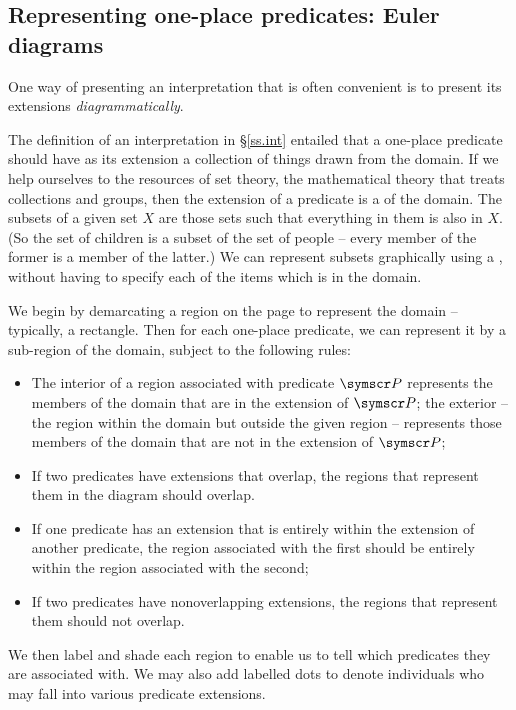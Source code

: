\begin{earg}
\section{Representing one-place predicates: Euler diagrams}\label{euler}

One way of presenting an interpretation that is often convenient is to present its extensions \emph{diagrammatically}.

The definition of an interpretation in §\ref{ss.int} entailed that a one-place predicate should have as its extension a collection of things drawn from the domain. If we help ourselves to the resources of set theory, the mathematical theory that treats collections and groups, then the extension of a predicate is a  of the domain. The subsets of a given set $X$ are those sets such that everything in them is also in $X$. (So the set of children is a subset of the set of people – every member of the former is a member of the latter.) We can represent subsets graphically using a , without having to specify each of the items which is in the domain.

We begin by demarcating a region on the page to represent the domain – typically, a rectangle. Then for each one-place predicate, we can represent it by a sub-region of the domain, subject to the following rules: \begin{itemize}
\item The interior of a region associated with predicate $\meta{P}$ represents the members of the domain that are in the extension of $\meta{P}$; the exterior – the region within the domain but outside the given region – represents those members of the domain that are not in the extension of $\meta{P}$;
	\item If two predicates have extensions that overlap, the regions that represent them in the diagram should overlap.
	\item If one predicate has an extension that is entirely within the extension of another predicate, the region associated with the first should be entirely within the region associated with the second;
	\item If two predicates have nonoverlapping extensions, the regions that represent them should not overlap.
\end{itemize} We then label and shade each region to enable us to tell which predicates they are associated with. We may also add labelled dots to denote individuals who may fall into various predicate extensions.


\end{earg}
